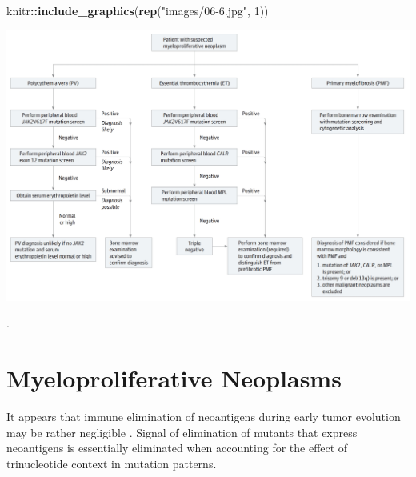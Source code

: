 \documentclass[]{book}
\newenvironment{Shaded}{\begin{snugshade}}{\end{snugshade}}
\newcommand{\DataTypeTok}[1]{\textcolor[rgb]{0.13,0.29,0.53}{#1}}
\newcommand{\DecValTok}[1]{\textcolor[rgb]{0.00,0.00,0.81}{#1}}
\newcommand{\KeywordTok}[1]{\textcolor[rgb]{0.13,0.29,0.53}{\textbf{#1}}}
\newcommand{\NormalTok}[1]{#1}
\newcommand{\OperatorTok}[1]{\textcolor[rgb]{0.81,0.36,0.00}{\textbf{#1}}}
\newcommand{\OtherTok}[1]{\textcolor[rgb]{0.56,0.35,0.01}{#1}}
\newcommand{\StringTok}[1]{\textcolor[rgb]{0.31,0.60,0.02}{#1}}
\begin{document}
\begin{Shaded}
\begin{Highlighting}[]
\NormalTok{knitr}\OperatorTok{::}\KeywordTok{include_graphics}\NormalTok{(}\KeywordTok{rep}\NormalTok{(}\StringTok{"images/06-6.jpg"}\NormalTok{, }\DecValTok{1}\NormalTok{))          }
\end{Highlighting}
\end{Shaded}

\includegraphics{images/06-6.jpg}

\begin{Shaded}
\end{Shaded}

\citep{tefferi2015myeloproliferative}.

\hypertarget{myeloproliferative-neoplasms-1}{%
\section{Myeloproliferative Neoplasms}\label{myeloproliferative-neoplasms-1}}

It appears that immune elimination of neoantigens during early tumor evolution may be rather negligible \citep{Van_den_Eynden2019-mn}. Signal of elimination of mutants that express neoantigens is essentially eliminated when accounting for the effect of trinucleotide context in mutation patterns.
\end{document}
